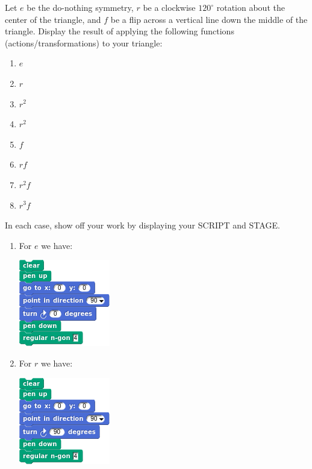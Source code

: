 \documentclass[noauthor,nooutcomes,12pt,hints]{ximera}
\begin{document}
\begin{question}
  Let $e$ be the do-nothing symmetry, $r$ be a clockwise $120^\circ$
  rotation about the center of the triangle, and $f$ be a flip across
  a vertical line down the middle of the triangle. Display the result
  of applying the following functions (actions/transformations) to
  your triangle:
  \begin{enumerate}
  \item $e$
  \item $r$
  \item $r^2$
  \item $r^2$
  \item $f$
  \item $rf$
  \item $r^2 f$
  \item $r^3 f$
  \end{enumerate}
  In each case, show off your work by displaying your SCRIPT and
  STAGE.
  \begin{freeResponse}
    \begin{enumerate}
    \item For $e$ we have:
      \begin{center}
        \includegraphics[width=.3\textwidth]{eSqSCRIPT.png}   \qquad {}
      \end{center}
    \item For $r$ we have:
      \begin{center}
        \includegraphics[width=.3\textwidth]{rSqSCRIPT.png}   \qquad {}

\end{center}
\end{enumerate}
\end{freeResponse}
\end{question}
\end{document}
